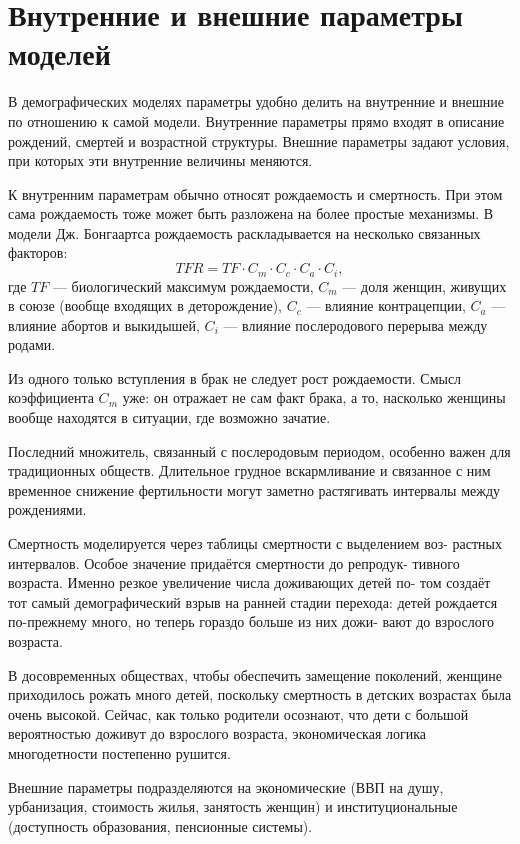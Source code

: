 \documentclass[a4paper, 14pt]{extarticle}
\begin{document}
\section{Внутренние и внешние параметры моделей}

В демографических моделях параметры удобно делить на внутренние и внешние по отношению к самой модели. Внутренние параметры прямо входят в описание рождений, смертей и возрастной структуры. Внешние параметры задают условия, при которых эти внутренние величины меняются.

К внутренним параметрам обычно относят рождаемость и смертность. При этом сама рождаемость тоже может быть разложена на более простые механизмы. В модели Дж. Бонгаартса рождаемость раскладывается на несколько связанных факторов:
\[
TFR = TF \cdot C_m \cdot C_c \cdot C_a \cdot C_i,
\]
где $TF$ --- биологический максимум рождаемости, $C_m$ --- доля женщин, живущих в союзе (вообще входящих в деторождение), $C_c$ --- влияние контрацепции, $C_a$ --- влияние абортов и выкидышей, $C_i$ --- влияние послеродового перерыва между родами.

Из одного только вступления в брак не следует рост рождаемости. Смысл коэффициента $C_m$ уже: он отражает не сам факт брака, а то, насколько женщины вообще находятся в ситуации, где возможно зачатие.

Последний множитель, связанный с послеродовым периодом, особенно важен для традиционных обществ. Длительное грудное вскармливание и связанное с ним временное снижение фертильности могут заметно растягивать интервалы между рождениями.

Смертность моделируется через таблицы смертности с выделением воз-
растных интервалов. Особое значение придаётся смертности до репродук-
тивного возраста. Именно резкое увеличение числа доживающих детей по-
том создаёт тот самый демографический взрыв на ранней стадии перехода:
детей рождается по-прежнему много, но теперь гораздо больше из них дожи-
вают до взрослого возраста.

В досовременных обществах, чтобы обеспечить замещение поколений, женщине приходилось рожать много детей, поскольку смертность в детских возрастах была очень высокой. Сейчас, как только родители осознают, что дети с большой вероятностью доживут до взрослого возраста, экономическая логика многодетности постепенно рушится.

Внешние параметры подразделяются на экономические (ВВП на душу, урбанизация, стоимость жилья, занятость женщин) и институциональные (доступность образования, пенсионные системы).
\end{document}
